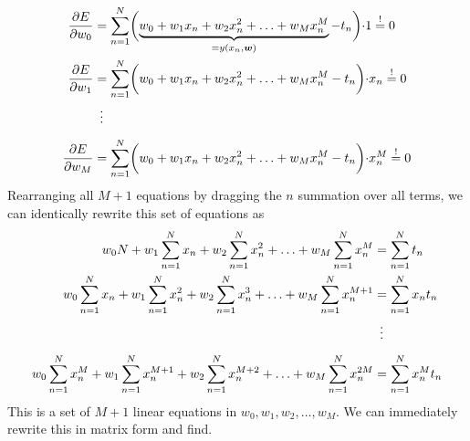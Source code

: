 \documentclass[11pt,DINA4, fleqn]{amsart}
\def\vw{\boldsymbol{w}\xspace}
\begin{document}
\begin{align}
\dfrac{\partial E}{\partial w_0} &= \sum \displaylimits_{n = 1}^{N}
\biggl(\underbrace{w_0 + w_1 x_n + w_2 x_n^2 + \dotsc + w_M x_n^M}_{=y(x_n,\vw)} - t_n\biggl) \cdot 1
\overset{!}{=} 0 \\
\dfrac{\partial E}{\partial w_1} &= \sum \displaylimits_{n = 1}^{N}
\biggl(w_0 + w_1 x_n + w_2 x_n^2 + \dotsc + w_M x_n^M - t_n\biggl) \cdot x_n
\overset{!}{=} 0 \\
\phantom{\dfrac{\partial E}{\partial w_M}}&\,\,\,\vdots \\
\dfrac{\partial E}{\partial w_M} &= \sum \displaylimits_{n = 1}^{N}
\biggl(w_0 + w_1 x_n + w_2 x_n^2 + \dotsc + w_M x_n^M - t_n\biggl) \cdot x_n^M
\overset{!}{=} 0
\end{align}
Rearranging all $M+1$ equations by dragging the $n$ summation over all terms, we can identically rewrite this set of equations as
\begin{align}
w_0 N + w_1 \sum\displaylimits_{n = 1}^{N}x_n
+ w_2 \sum\displaylimits_{n = 1}^{N}x_n^2 + \dotsc + w_M \sum\displaylimits_{n = 1}^{N}x_n^M  &= \sum\displaylimits_{n = 1}^{N} t_n \\
w_0 \sum\displaylimits_{n = 1}^{N} x_n + w_1 \sum\displaylimits_{n = 1}^{N}x_n^2
+ w_2 \sum\displaylimits_{n = 1}^{N}x_n^3 + \dotsc + w_M \sum\displaylimits_{n = 1}^{N}x_n^{M + 1}  &= \sum\displaylimits_{n = 1}^{N} x_n t_n
 \\
\phantom{\dfrac{\partial E}{\partial w_M}}&\,\,\,\vdots \\
w_0 \sum\displaylimits_{n = 1}^{N} x_n^M + w_1 \sum\displaylimits_{n = 1}^{N}x_n^{M+1}
+ w_2 \sum\displaylimits_{n = 1}^{N}x_n^{M+2} + \dotsc + w_M \sum\displaylimits_{n = 1}^{N}x_n^{2M}  &= \sum\displaylimits_{n = 1}^{N} x_n^M t_n
\end{align}
This is a set of $M+1$ linear equations in $w_0, w_1, w_2, \dotsc, w_M$. We can immediately rewrite this in matrix form and find.
\end{document}
